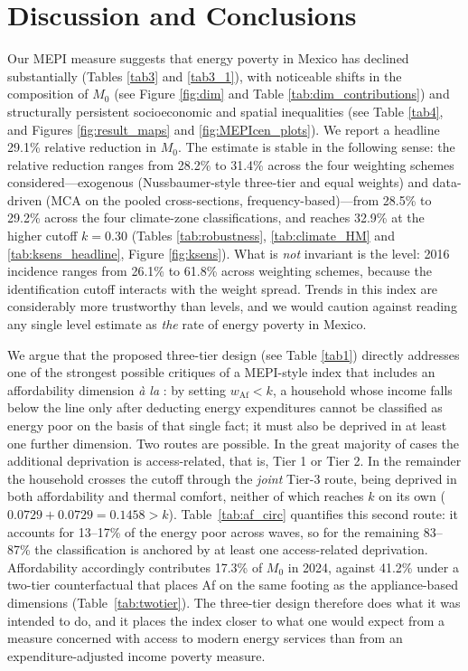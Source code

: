 \documentclass[11pt, a4paper]{article}
\begin{document}
\FloatBarrier

\section{Discussion and Conclusions} \label{conclu}

Our MEPI measure suggests that energy poverty in Mexico has declined substantially (Tables \ref{tab3} and \ref{tab3_1}), with noticeable shifts in the composition of $M_0$ (see Figure \ref{fig:dim} and Table \ref{tab:dim_contributions}) and structurally persistent socioeconomic and spatial inequalities (see Table \ref{tab4}, and Figures \ref{fig:result_maps} and \ref{fig:MEPIcen_plots}). We report a headline 29.1\% relative reduction in $M_0$. The estimate is stable in the following sense: the relative reduction ranges from 28.2\% to 31.4\% across the four weighting schemes considered---exogenous (Nussbaumer-style three-tier and equal weights) and data-driven (MCA on the pooled cross-sections, frequency-based)---from 28.5\% to 29.2\% across the four climate-zone classifications, and reaches 32.9\% at the higher cutoff $k=0.30$ (Tables \ref{tab:robustness}, \ref{tab:climate_HM} and \ref{tab:ksens_headline}, Figure \ref{fig:ksens}). What is \emph{not} invariant is the level: 2016 incidence ranges from 26.1\% to 61.8\% across weighting schemes, because the identification cutoff interacts with the weight spread. Trends in this index are considerably more trustworthy than levels, and we would caution against reading any single level estimate as \textit{the} rate of energy poverty in Mexico.

We argue that the proposed three-tier design (see Table \ref{tab1}) directly addresses one of the strongest possible critiques of a MEPI-style index that includes an affordability dimension \emph{à la} \textcite{hills2011, hills2012}: by setting $w_{\mathrm{Af}} < k$, a household whose income falls below the line only after deducting energy expenditures cannot be classified as energy poor on the basis of that single fact; it must also be deprived in at least one further dimension. Two routes are possible. In the great majority of cases the additional deprivation is access-related, that is, Tier 1 or Tier 2. In the remainder the household crosses the cutoff through the \emph{joint} Tier-3 route, being deprived in both affordability and thermal comfort, neither of which reaches $k$ on its own ($0.0729 + 0.0729 = 0.1458 > k$). Table~\ref{tab:af_circ} quantifies this second route: it accounts for 13--17\% of the energy poor across waves, so for the remaining 83--87\% the classification is anchored by at least one access-related deprivation. Affordability accordingly contributes 17.3\% of $M_0$ in 2024, against 41.2\% under a two-tier counterfactual that places Af on the same footing as the appliance-based dimensions (Table~\ref{tab:twotier}). The three-tier design therefore does what it was intended to do, and it places the index closer to what one would expect from a measure concerned with access to modern energy services than from an expenditure-adjusted income poverty measure.
\end{document}
